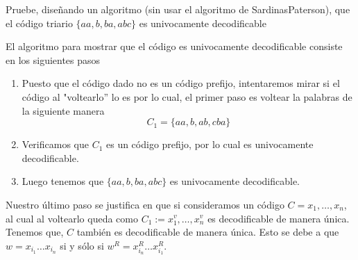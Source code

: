 
Pruebe, diseñando un algoritmo (sin usar el algoritmo de SardinasPaterson), que el código triario $\{aa, b, ba, abc\}$ es univocamente decodificable
\begin{sol}
El algoritmo para mostrar que el código es univocamente decodificable consiste en los siguientes pasos
\begin{enumerate}
\item Puesto que el código dado no es un código prefijo, intentaremos mirar si el código al "voltearlo''  lo es por lo cual, el primer paso es voltear la palabras de la siguiente manera 
$$C_1=\{aa,b,ab,cba\}$$
\item Verificamos que $C_1$ es un código prefijo, por lo cual es univocamente decodificable.
\item Luego tenemos que  $\{aa, b, ba, abc\}$ es univocamente decodificable.
\end{enumerate}
Nuestro último paso se justifica en que si consideramos un código $ C = x_1, \dots, x_n $, al cual al voltearlo queda como $C_1 := x_1^v, \dots, x_n^v $ es decodificable de manera única. \\
Tenemos que, $C$  también es decodificable de manera única. Esto se debe a que $ w = x_{i_1} \dots x_{i_n} $ si y sólo si $ w^R = x_{i_n}^R\dots x_{i_1}^R$. 
    
\end{sol}
